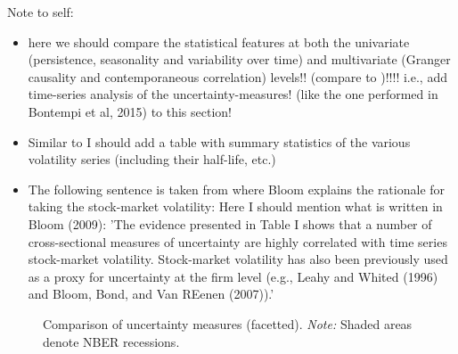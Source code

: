 \documentclass[a4paper,12pt,oneside,pointednumbers,bibtotoc,bigheadings,liststotoc]{scrbook}
\begin{document}
\begingroup
    \fontsize{8pt}{12pt}\selectfont
    Note to self:
\begin{itemize}
	\item here we should compare the statistical features at both the univariate (persistence, seasonality and variability over time) and multivariate (Granger causality and contemporaneous correlation) levels!! (compare to \citet{bontempietal:16})!!!! i.e., add time-series analysis of the uncertainty-measures! (like the one performed in Bontempi et al, 2015) to this section!
	\item Similar to \citet{juradoetal:15} I should add a table with summary statistics of the various volatility series (including their half-life, etc.)
	\item The following sentence is taken from \citet{bloom:09} where Bloom explains the rationale for taking the stock-market volatility: Here I should mention what is written in Bloom (2009): 'The evidence presented in Table I shows that a number of cross-sectional measures of uncertainty are highly correlated with time series stock-market volatility. Stock-market volatility has also been previously used as a proxy for uncertainty at the firm level (e.g., Leahy and Whited (1996) and Bloom, Bond, and Van REenen (2007)).'

\end{itemize}
\endgroup




\begin{landscape}
\begin{figure}[!ht]
   \centering
   \setlength\fboxsep{0pt}
   \setlength\fboxrule{0pt}
      \caption[Comparison of uncertainty measures (combined).]{Comparison of uncertainty measures (facetted).
      \textit{Note:} Shaded areas denote NBER recessions.}   \label{fig:comparison_plot_combined}
\end{figure}
\end{landscape}
\end{document}
